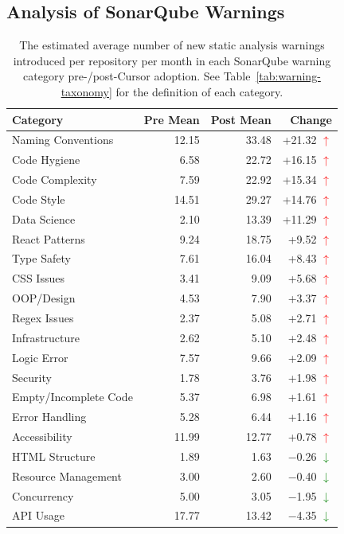 \subsection{Analysis of SonarQube Warnings}

\begin{table}
\centering
\caption{The estimated average number of new static analysis warnings introduced per repository per month in each SonarQube warning category pre-/post-Cursor adoption. See Table~\ref{tab:warning-taxonomy} for the definition of each category.}
\label{tab:warnings-by-category}
\small
\begin{tabular}{lrrr}
\toprule
\textbf{Category} & \textbf{Pre Mean} & \textbf{Post Mean} & \textbf{Change} \\
\midrule
Naming Conventions    & 12.15 & 33.48 & +21.32 \textcolor{red}{$\uparrow$} \\
Code Hygiene          &  6.58 & 22.72 & +16.15 \textcolor{red}{$\uparrow$} \\
Code Complexity       &  7.59 & 22.92 & +15.34 \textcolor{red}{$\uparrow$} \\
Code Style            & 14.51 & 29.27 & +14.76 \textcolor{red}{$\uparrow$} \\
Data Science          &  2.10 & 13.39 & +11.29 \textcolor{red}{$\uparrow$} \\
React Patterns        &  9.24 & 18.75 & +9.52 \textcolor{red}{$\uparrow$} \\
Type Safety           &  7.61 & 16.04 & +8.43 \textcolor{red}{$\uparrow$} \\
CSS Issues            &  3.41 &  9.09 & +5.68 \textcolor{red}{$\uparrow$} \\
OOP/Design            &  4.53 &  7.90 & +3.37 \textcolor{red}{$\uparrow$} \\
Regex Issues          &  2.37 &  5.08 & +2.71 \textcolor{red}{$\uparrow$} \\
Infrastructure        &  2.62 &  5.10 & +2.48 \textcolor{red}{$\uparrow$} \\
Logic Error           &  7.57 &  9.66 & +2.09 \textcolor{red}{$\uparrow$} \\
Security              &  1.78 &  3.76 & +1.98 \textcolor{red}{$\uparrow$} \\
Empty/Incomplete Code &  5.37 &  6.98 & +1.61 \textcolor{red}{$\uparrow$} \\
Error Handling        &  5.28 &  6.44 & +1.16 \textcolor{red}{$\uparrow$} \\
Accessibility         & 11.99 & 12.77 & +0.78 \textcolor{red}{$\uparrow$} \\
HTML Structure        &  1.89 &  1.63 & $-$0.26 \textcolor{green}{$\downarrow$} \\
Resource Management   &  3.00 &  2.60 & $-$0.40 \textcolor{green}{$\downarrow$} \\
Concurrency           &  5.00 &  3.05 & $-$1.95 \textcolor{green}{$\downarrow$} \\
API Usage             & 17.77 & 13.42 & $-$4.35 \textcolor{green}{$\downarrow$} \\
\bottomrule
\end{tabular}
\end{table}

